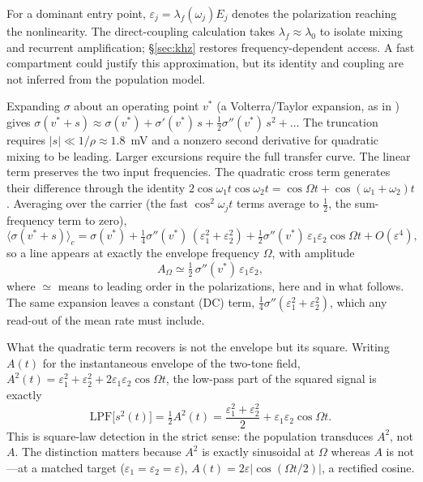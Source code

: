 \documentclass[11pt,a4paper]{article}
\newcommand{\Sig}{\sigma}
\newcommand{\half}{\tfrac{1}{2}}
\begin{document}
For a dominant entry point, $\varepsilon_j=\lambda_f(\omega_j)E_j$ denotes the
polarization reaching the nonlinearity. The direct-coupling calculation takes
$\lambda_f\approx\lambda_0$ to isolate mixing and recurrent amplification;
\S\ref{sec:khz} restores frequency-dependent access. A fast compartment could
justify this approximation, but its identity and coupling are not inferred from
the population model.

Expanding $\Sig$ about an operating point $v^*$ (a Volterra/Taylor expansion, as
in \cite{ruffini2025ham}) gives
$\Sig(v^*+s)\approx\Sig(v^*)+\Sig'(v^*)\,s+\half\Sig''(v^*)\,s^2+\dots$
The truncation requires $|s|\ll1/\rho\approx1.8$~mV and a nonzero second derivative
for quadratic mixing to be leading. Larger excursions require the full transfer curve.
The linear term preserves the two input frequencies. The quadratic cross term
generates their difference through the identity
$2\cos\omega_1t\cos\omega_2t=\cos\Omega t+\cos(\omega_1+\omega_2)t$.
Averaging over the carrier (the fast
$\cos^2\omega_jt$ terms average to $\half$, the sum-frequency term to zero),
\begin{equation}
\big\langle\Sig(v^*+s)\big\rangle_c
=\Sig(v^*)+\tfrac14\Sig''(v^*)\,(\varepsilon_1^2+\varepsilon_2^2)
+\tfrac12\Sig''(v^*)\,\varepsilon_1\varepsilon_2\cos\Omega t+O(\varepsilon^4),
\label{eq:taylor}
\end{equation}
so a line appears at exactly the envelope frequency $\Omega$, with amplitude
\begin{equation}
A_\Omega\simeq\half\,\Sig''(v^*)\,\varepsilon_1\varepsilon_2 ,
\label{eq:demod}
\end{equation}
where $\simeq$ means to leading order in the polarizations, here and in what follows. The
same expansion leaves a constant (DC) term, $\tfrac14\Sig''(\varepsilon_1^2+\varepsilon_2^2)$,
which any read-out of the mean rate must include.

What the quadratic term recovers is not the envelope but its square. Writing $A(t)$ for
the instantaneous envelope of the two-tone field,
$A^2(t)=\varepsilon_1^2+\varepsilon_2^2+2\varepsilon_1\varepsilon_2\cos\Omega t$, the
low-pass part of the squared signal is exactly
\begin{equation}
\mathrm{LPF}\big[s^2(t)\big]=\half A^2(t)
=\frac{\varepsilon_1^2+\varepsilon_2^2}{2}+\varepsilon_1\varepsilon_2\cos\Omega t .
\label{eq:sqenv}
\end{equation}
This is square-law detection in the strict sense: the population transduces $A^2$, not
$A$. The distinction matters because $A^2$ is exactly sinusoidal at $\Omega$
whereas $A$ is not---at a matched target ($\varepsilon_1=\varepsilon_2=\varepsilon$),
$A(t)=2\varepsilon|\cos(\Omega t/2)|$, a rectified cosine.
\end{document}
